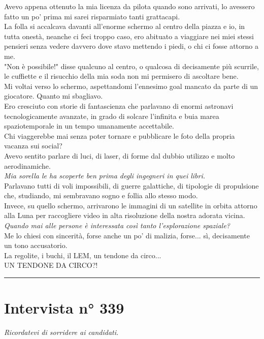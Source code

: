 \documentclass[9pt, twoside]{article}
\begin{document}
Avevo appena ottenuto la mia licenza da pilota quando sono arrivati, lo avessero fatto un po' prima mi sarei risparmiato tanti grattacapi.\\
La folla si accalcava davanti all'enorme schermo al centro della piazza e io, in tutta onestà, neanche ci feci troppo caso, ero abituato a viaggiare nei miei stessi pensieri senza vedere davvero dove stavo mettendo i piedi, o chi ci fosse attorno a me. \\
"Non è possibile!" disse qualcuno al centro, o qualcosa di decisamente più scurrile, le cuffiette e il risucchio della mia soda non mi permisero di ascoltare bene. \\
Mi voltai verso lo schermo, aspettandomi l'ennesimo goal mancato da parte di un giocatore. Quanto mi sbagliavo. \\
Ero cresciuto con storie di fantascienza che parlavano di enormi astronavi tecnologicamente avanzate, in grado di solcare l'infinita e buia marea spaziotemporale in un tempo umanamente accettabile. \\
Chi viaggerebbe mai senza poter tornare e pubblicare le foto della propria vacanza sui social? \\
Avevo sentito parlare di luci, di laser, di forme dal dubbio utilizzo e molto aerodinamiche. \\
\textit{Mia sorella le ha scoperte ben prima degli ingegneri in quei libri.} \\
Parlavano tutti di voli impossibili, di guerre galattiche, di tipologie di propulsione che, studiando, mi sembravano sogno e follia allo stesso modo.\\
Invece, su quello schermo, arrivarono le immagini di un satellite in orbita attorno alla Luna per raccogliere video in alta risoluzione della nostra adorata vicina.\\
\textit{Quando mai alle persone è interessata così tanto l'esplorazione spaziale?} \\
Me lo chiesi con sincerità, forse anche un po' di malizia, forse... sì, decisamente un tono accusatorio. \\
La regolite, i buchi, il LEM, un tendone da circo... \\
UN TENDONE DA CIRCO?!

\vspace{4mm}
\hrule
\vspace{4mm}

\section{Intervista n° 339}
\begin{tcolorbox}[breakable, hbox, center, fontupper=\small, halign=center]
\textit{Ricordatevi di sorridere ai candidati.}
\end{tcolorbox}
\vspace{2mm}
\end{document}
